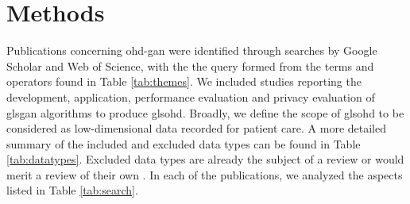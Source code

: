\section{Methods}



Publications concerning \gls{ohd-gan} were identified through searches by Google Scholar and Web of Science, with the the query formed from the terms and operators found in Table \ref{tab:themes}. We included studies reporting the development, application, performance evaluation and privacy evaluation of gls{gan} algorithms to produce gls{ohd}. Broadly, we define the scope of gls{ohd} to be considered as low-dimensional data recorded for patient care. A more detailed summary of the included and excluded data types can be found in Table \ref{tab:datatypes}. Excluded data types are already the subject of a review or would merit a review of their own \cite{Yi_2019}\cite{Nakata2019}\cite{Anwar_2018}. In each of the publications, we analyzed the aspects listed in Table \ref{tab:search}.\par











